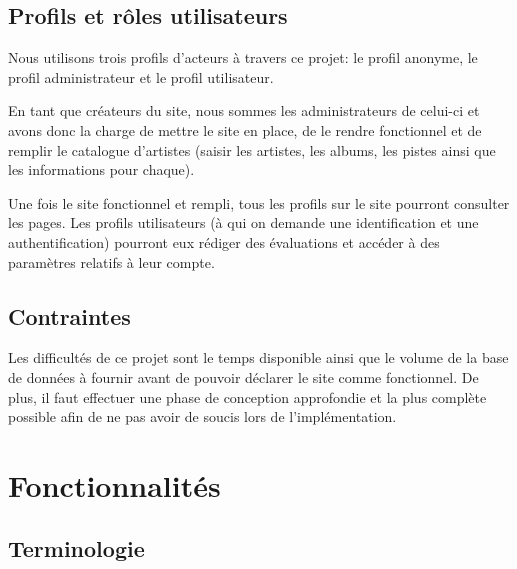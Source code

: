     \subsection{Profils et rôles utilisateurs}

        \begin{paragraphe}
            Nous utilisons trois profils d’acteurs à travers ce projet: le profil
            anonyme, le profil administrateur et le profil utilisateur.
        \end{paragraphe}

        \begin{paragraphe}
            En tant que créateurs du site, nous sommes les administrateurs de celui-ci
            et avons donc la charge de mettre le site en place, de le rendre
            fonctionnel et de remplir le catalogue d'artistes (saisir les artistes, les
            albums, les pistes ainsi que les informations pour chaque).
        \end{paragraphe}

        \begin{paragraphe}
            Une fois le site fonctionnel et rempli, tous les profils sur le site pourront 
            consulter les pages.
            Les profils utilisateurs (à qui on demande une identification et une authentification) 
            pourront eux rédiger des évaluations et accéder à des paramètres relatifs à leur compte.
        \end{paragraphe}

    \subsection{Contraintes}

        \begin{paragraphe}
            Les difficultés de ce projet sont le temps disponible ainsi que le volume
            de la base de données à fournir avant de pouvoir déclarer le site comme
            fonctionnel. De plus, il faut effectuer une phase de conception approfondie et la 
            plus complète possible afin de ne pas avoir de soucis lors de l'implémentation.
        \end{paragraphe}

\section{Fonctionnalités}

\subsection{Terminologie}

